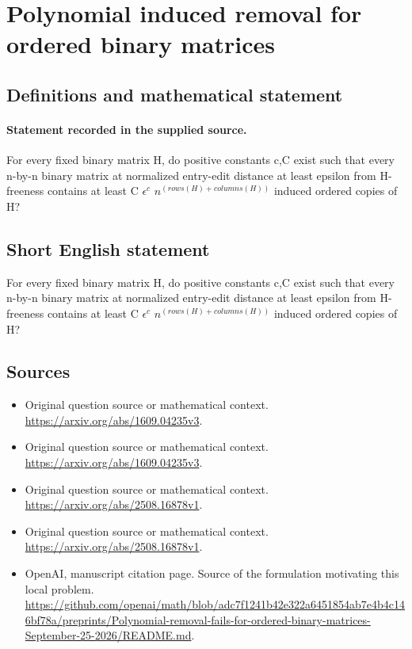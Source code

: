 \documentclass[11pt]{article}
\begin{document}
\section*{Polynomial induced removal for ordered binary matrices}\label{30007097}
\subsection{Definitions and mathematical statement}
\paragraph{Statement recorded in the supplied source.}
For every fixed binary matrix H, do positive constants c,C exist such that every n-by-n binary matrix at normalized entry-edit distance at least epsilon from H-freeness contains at least C $\epsilon ^c$ $n^(rows(H)+columns(H))$ induced ordered copies of H?
\subsection{Short English statement}
For every fixed binary matrix H, do positive constants c,C exist such that every n-by-n binary matrix at normalized entry-edit distance at least epsilon from H-freeness contains at least C $\epsilon ^c$ $n^(rows(H)+columns(H))$ induced ordered copies of H?
\subsection{Sources}
\begin{itemize}
\item[S1] Original question source or mathematical context.
\url{https://arxiv.org/abs/1609.04235v3}.
\item[S2] Original question source or mathematical context.
\url{https://arxiv.org/abs/1609.04235v3}.
\item[S3] Original question source or mathematical context.
\url{https://arxiv.org/abs/2508.16878v1}.
\item[S4] Original question source or mathematical context.
\url{https://arxiv.org/abs/2508.16878v1}.
\item[S5] OpenAI, manuscript citation page. Source of the formulation motivating this local problem.
\url{https://github.com/openai/math/blob/adc7f1241b42e322a6451854ab7e4b4c146bf78a/preprints/Polynomial-removal-fails-for-ordered-binary-matrices-September-25-2026/README.md}.
\end{itemize}
\end{document}
